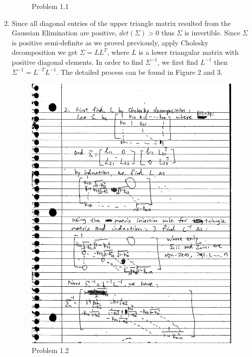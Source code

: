 \documentclass{article}
\begin{document}
\begin{enumerate}
\begin{figure}[h]
        \caption{Problem 1.1}
    \end{figure}
\item
    Since all diagonal entries of the upper triangle matrix resulted from the Gaussian Elimination are positive, $det(\Sigma) > 0$ thus $\Sigma$ is invertible. Since $\Sigma$ is positive semi-definite as we proved previously, apply Cholesky decomposition we get $\Sigma = LL^T$, where $L$ is a lower triangular matrix with positive diagonal elements. In order to find $\Sigma^{-1}$, we first find $L^{-1}$ then $\Sigma^{-1} = L^{-T}L^{-1}$. The detailed process can be found in Figure 2 and 3.
    \begin{figure}[h]
        \includegraphics[width=1.0\linewidth]{sec.png}
        \caption{Problem 1.2}
    \end{figure}
    \begin{figure}[h]

\end{figure}
\end{enumerate}
\end{document}
